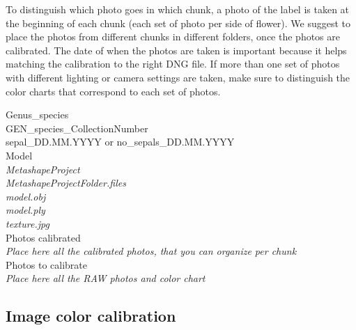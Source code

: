 \documentclass[10pt,letter,english]{article}
\begin{document}
To distinguish which photo goes in which chunk, a photo of the label is taken at the beginning of each chunk (each set of photo per side of flower). We suggest to place the photos from different chunks in different folders, once the photos are calibrated. The date of when the photos are taken is important because it helps matching the calibration to the right DNG file. If more than one set of photos with different lighting or camera settings are taken, make sure to distinguish the color charts that correspond to each set of photos.

\begin{tcolorbox}[width=\linewidth, colback=mygray,title=Suggestion for the Joly lab: example of file organization,colframe=lightgray]
Genus\_species\\
\hspace*{1cm} GEN\_species\_CollectionNumber\\
  \hspace*{2cm} sepal\_DD.MM.YYYY or no\_sepals\_DD.MM.YYYY\\
    \hspace*{3cm} Model\\
        \hspace*{4cm} \textit{MetashapeProject}\\
        \hspace*{4cm} \textit{MetashapeProjectFolder.files}\\
        \hspace*{4cm} \textit{model.obj}\\
        \hspace*{4cm} \textit{model.ply}\\
        \hspace*{4cm} \textit{texture.jpg}\\
    \hspace*{3cm} Photos calibrated\\
        \hspace*{4cm} \textit{Place here all the calibrated photos, that you can organize per chunk}\\
    \hspace*{3cm} Photos to calibrate\\
        \hspace*{4cm} \textit{Place here all the RAW photos and color chart}\\
\end{tcolorbox}





\subsection{Image color calibration}
\end{document}
